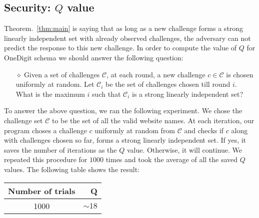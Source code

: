 \documentclass{article}
\begin{document}
\subsection{Security: $Q$ value}

Theorem.~\ref{thm:main} is saying that as long as a new challenge forms a strong linearly independent set with already observed challenges, the adversary can not predict the response to this new challenge. In order to compute the value of $Q$ for OneDigit schema we should answer the following question:
\begin{itemize}
	\item[$\diamond$] Given a set of challenges $\mathcal{C}$, at each round, a new challenge $c \in \mathcal{C}$ is chosen uniformly at random. Let $\mathcal{C}_i$ be the set of challenges chosen till round $i$. What is the maximum $i$
	such that $\mathcal{C}_i$ is a strong linearly independent set?
	\end{itemize}
To answer the above question, we ran the following experiment. We chose the challenge set $\mathcal{C}$ to be the set of all the valid website names. At each iteration, our program choses a challenge $c$ uniformly at random from $\mathcal{C}$ and checks if $c$ along with challenges chosen so far, forms a strong linearly independent set. If yes, it saves the number of iterations as the $Q$ value. Otherwise, it will continue. We repeated this procedure for $1000$ times and took the average of all the saved $Q$ values. The following table shows the result:

\vspace{3mm}


\begin{center}
\begin{tabular}{c|r}
Number of trials              & Q  \\
\hline
1000              &   $\sim 18$             \\
\end{tabular}
\label{QValue}
\end{center}
\end{document}
